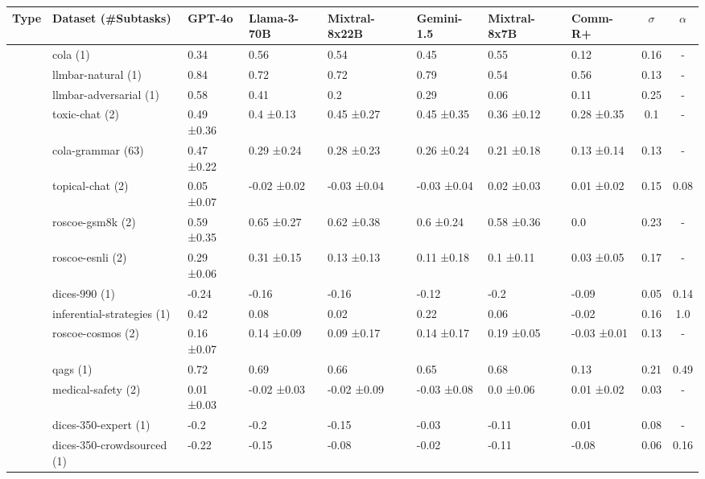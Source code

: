\begin{tabular}{llllllll|cc}
\toprule
Type & Dataset (\#Subtasks) & GPT-4o & Llama-3-70B & Mixtral-8x22B & Gemini-1.5 & Mixtral-8x7B & Comm-R+ & $\sigma$ & $\alpha$ \\
\midrule
 & \cellcolor{blue!25}cola (1) & 0.34  & 0.56  & 0.54  & 0.45  & 0.55  & 0.12  & 0.16 & - \\
 & \cellcolor{blue!25}llmbar-natural (1) & 0.84  & 0.72  & 0.72  & 0.79  & 0.54  & 0.56  & 0.13 & - \\
 & \cellcolor{blue!25}llmbar-adversarial (1) & 0.58  & 0.41  & 0.2  & 0.29  & 0.06  & 0.11  & 0.25 & - \\
 & \cellcolor{blue!25}toxic-chat (2) & 0.49 ±0.36 & 0.4 ±0.13 & 0.45 ±0.27 & 0.45 ±0.35 & 0.36 ±0.12 & 0.28 ±0.35 & 0.1 & - \\
 & \cellcolor{blue!25}cola-grammar (63) & 0.47 ±0.22 & 0.29 ±0.24 & 0.28 ±0.23 & 0.26 ±0.24 & 0.21 ±0.18 & 0.13 ±0.14 & 0.13 & - \\
 & \cellcolor{red!25}topical-chat (2) & 0.05 ±0.07 & -0.02 ±0.02 & -0.03 ±0.04 & -0.03 ±0.04 & 0.02 ±0.03 & 0.01 ±0.02 & 0.15 & 0.08 \\
 & \cellcolor{red!25}roscoe-gsm8k (2) & 0.59 ±0.35 & 0.65 ±0.27 & 0.62 ±0.38 & 0.6 ±0.24 & 0.58 ±0.36 & 0.0 & 0.23 & - \\
 & \cellcolor{red!25}roscoe-esnli (2) & 0.29 ±0.06 & 0.31 ±0.15 & 0.13 ±0.13 & 0.11 ±0.18 & 0.1 ±0.11 & 0.03 ±0.05 & 0.17 & - \\
 & \cellcolor{red!25}dices-990 (1) & -0.24  & -0.16  & -0.16  & -0.12  & -0.2  & -0.09  & 0.05 & 0.14 \\
 & \cellcolor{red!25}inferential-strategies (1) & 0.42  & 0.08  & 0.02  & 0.22  & 0.06  & -0.02  & 0.16 & 1.0 \\
 & \cellcolor{red!25}roscoe-cosmos (2) & 0.16 ±0.07 & 0.14 ±0.09 & 0.09 ±0.17 & 0.14 ±0.17 & 0.19 ±0.05 & -0.03 ±0.01 & 0.13 & - \\
 & \cellcolor{red!25}qags (1) & 0.72  & 0.69  & 0.66  & 0.65  & 0.68  & 0.13  & 0.21 & 0.49 \\
 & \cellcolor{red!25}medical-safety (2) & 0.01 ±0.03 & -0.02 ±0.03 & -0.02 ±0.09 & -0.03 ±0.08 & 0.0 ±0.06 & 0.01 ±0.02 & 0.03 & - \\
 & \cellcolor{red!25}dices-350-expert (1) & -0.2  & -0.2  & -0.15  & -0.03  & -0.11  & 0.01  & 0.08 & - \\
 & \cellcolor{red!25}dices-350-crowdsourced (1) & -0.22  & -0.15  & -0.08  & -0.02  & -0.11  & -0.08  & 0.06 & 0.16 \\

\end{tabular}
